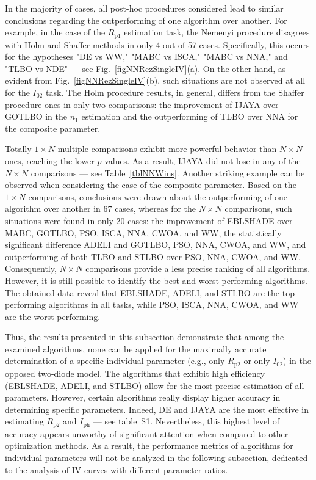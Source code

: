 \documentclass[a4paper,fleqn]{cas-sc}
\begin{document}
In the majority of cases, all post-hoc procedures considered lead to similar conclusions regarding the outperforming of one algorithm over another.
For example, in the case of the $R_\mathrm{p1}$ estimation task,
the Nemenyi procedure disagrees with Holm and Shaffer methods in only 4 out of 57 cases.
Specifically, this occurs for the hypotheses "DE vs WW," "MABC vs ISCA," "MABC vs NNA," and "TLBO vs NDE" --- see Fig.~\ref{figNNRezSingleIV}(a).
On the other hand, as evident from Fig.~\ref{figNNRezSingleIV}(b), such situations are not observed at all for the $I_{02}$ task.
The Holm procedure results, in general, differs from the Shaffer procedure ones in only two comparisons:
the improvement of IJAYA over GOTLBO in the $n_1$ estimation and the outperforming of TLBO over NNA for the composite parameter.

Totally $1\times N$ multiple comparisons exhibit more powerful behavior than $N\times N$ ones, reaching the lower $p$-values.
As a result, IJAYA did not lose in any of the $N\times N$ comparisons --- see Table~\ref{tblNNWins}.
Another striking  example can be observed when considering the case of the composite parameter.
Based on the $1\times N$ comparisons, conclusions were drawn about the outperforming of one algorithm over another in 67 cases,
whereas for the $N\times N$ comparisons, such situations were found in only 20 cases:
the improvement of EBLSHADE over MABC, GOTLBO, PSO, ISCA, NNA, CWOA, and WW,
the statistically significant difference ADELI and GOTLBO, PSO, NNA, CWOA, and WW,
and outperforming of both TLBO and STLBO over PSO, NNA, CWOA, and WW.
Consequently, $N\times N$ comparisons provide a less precise ranking of all algorithms.
However, it is still possible to identify the best and worst-performing algorithms.
The obtained data reveal that EBLSHADE, ADELI, and STLBO are the top-performing algorithms in all tasks,
while PSO, ISCA, NNA, CWOA, and WW are the worst-performing.

Thus, the results presented in this subsection demonstrate that
among the examined algorithms, none can be applied for the maximally accurate determination
of a specific individual parameter (e.g., only $R_\mathrm{p2}$ or only $I_{02}$) in the opposed two-diode model.
The algorithms that exhibit high efficiency (EBLSHADE, ADELI, and STLBO) allow for the most precise estimation of all parameters.
However, certain algorithms really display higher accuracy in determining specific parameters.
Indeed, DE and IJAYA are the most effective in estimating $R_\mathrm{p2}$ and $I_\mathrm{ph}$ --- see table~S1.
Nevertheless, this highest level of accuracy appears unworthy of significant attention when compared to other optimization methods.
As a result, the performance metrics of algorithms for individual parameters will not be analyzed
in the following subsection, dedicated to the analysis of IV curves with different parameter ratios.
\end{document}
